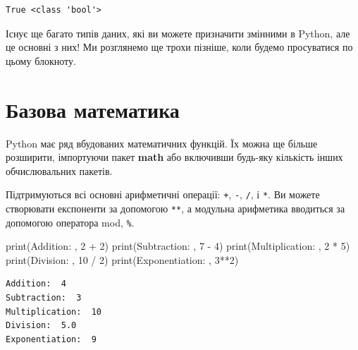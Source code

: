 \documentclass[
  letterpaper,
]{report}
\newenvironment{Shaded}{\begin{snugshade}}{\end{snugshade}}
\newcommand{\BuiltInTok}[1]{\textcolor[rgb]{0.00,0.23,0.31}{#1}}
\newcommand{\DecValTok}[1]{\textcolor[rgb]{0.68,0.00,0.00}{#1}}
\newcommand{\NormalTok}[1]{\textcolor[rgb]{0.00,0.23,0.31}{#1}}
\newcommand{\OperatorTok}[1]{\textcolor[rgb]{0.37,0.37,0.37}{#1}}
\newcommand{\StringTok}[1]{\textcolor[rgb]{0.13,0.47,0.30}{#1}}
\begin{document}
\begin{verbatim}
True <class 'bool'>
\end{verbatim}

Існує ще багато типів даних, які ви можете призначити змінними в Python,
але це основні з них! Ми розглянемо ще трохи пізніше, коли будемо
просуватися по цьому блокноту.

\hypertarget{ux431ux430ux437ux43eux432ux430-ux43cux430ux442ux435ux43cux430ux442ux438ux43aux430}{%
\section{Базова
математика}\label{ux431ux430ux437ux43eux432ux430-ux43cux430ux442ux435ux43cux430ux442ux438ux43aux430}}

Python має ряд вбудованих математичних функцій. Їх можна ще більше
розширити, імпортуючи пакет \textbf{math} або включивши будь-яку
кількість інших обчислювальних пакетів.

Підтримуються всі основні арифметичні операції: \texttt{+}, \texttt{-},
\texttt{/}, і \texttt{*}. Ви можете створювати експоненти за допомогою
\texttt{**}, а модульна арифметика вводиться за допомогою оператора mod,
\texttt{\%}.

\begin{Shaded}
\begin{Highlighting}[]
\BuiltInTok{print}\NormalTok{(}\StringTok{\textquotesingle{}Addition: \textquotesingle{}}\NormalTok{, }\DecValTok{2} \OperatorTok{+} \DecValTok{2}\NormalTok{)}
\BuiltInTok{print}\NormalTok{(}\StringTok{\textquotesingle{}Subtraction: \textquotesingle{}}\NormalTok{, }\DecValTok{7} \OperatorTok{{-}} \DecValTok{4}\NormalTok{)}
\BuiltInTok{print}\NormalTok{(}\StringTok{\textquotesingle{}Multiplication: \textquotesingle{}}\NormalTok{, }\DecValTok{2} \OperatorTok{*} \DecValTok{5}\NormalTok{)}
\BuiltInTok{print}\NormalTok{(}\StringTok{\textquotesingle{}Division: \textquotesingle{}}\NormalTok{, }\DecValTok{10} \OperatorTok{/} \DecValTok{2}\NormalTok{)}
\BuiltInTok{print}\NormalTok{(}\StringTok{\textquotesingle{}Exponentiation: \textquotesingle{}}\NormalTok{, }\DecValTok{3}\OperatorTok{**}\DecValTok{2}\NormalTok{)}
\end{Highlighting}
\end{Shaded}

\begin{verbatim}
Addition:  4
Subtraction:  3
Multiplication:  10
Division:  5.0
Exponentiation:  9
\end{verbatim}
\end{document}
